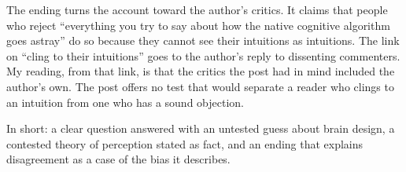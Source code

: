 \begin{afterword}
The ending turns the account toward the author's critics. It claims that people who reject ``everything you try to say about how the native cognitive algorithm goes astray'' do so because they cannot see their intuitions as intuitions. The link on ``cling to their intuitions'' goes to the author's reply to dissenting commenters. My reading, from that link, is that the critics the post had in mind included the author's own. The post offers no test that would separate a reader who clings to an intuition from one who has a sound objection.

In short: a clear question answered with an untested guess about brain design, a contested theory of perception stated as fact, and an ending that explains disagreement as a case of the bias it describes.
\end{afterword}
